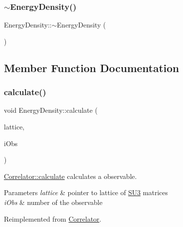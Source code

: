 \subsubsection{\texorpdfstring{$\sim$EnergyDensity()}{~EnergyDensity()}}
{\footnotesize\ttfamily Energy\+Density\+::$\sim$\+Energy\+Density (\begin{DoxyParamCaption}{ }\end{DoxyParamCaption})}



\subsection{Member Function Documentation}
\mbox{\label{class_energy_density_ae8e5e29257104d881bcabeadc3b2c9e7}} 
\subsubsection{\texorpdfstring{calculate()}{calculate()}}
{\footnotesize\ttfamily void Energy\+Density\+::calculate (\begin{DoxyParamCaption}\item[{\mbox{\hyperlink{class_lattice}{Lattice}}$<$ \mbox{\hyperlink{class_s_u3}{S\+U3}} $>$ $\ast$}]{lattice,  }\item[{unsigned int}]{i\+Obs }\end{DoxyParamCaption})\hspace{0.3cm}{\ttfamily [virtual]}}



\mbox{\hyperlink{class_correlator_ab33502ff305f891c5c2e6d66a26a0247}{Correlator\+::calculate}} calculates a observable. 


\begin{DoxyParams}{Parameters}
{\em lattice} & pointer to lattice of \mbox{\hyperlink{class_s_u3}{S\+U3}} matrices \\
\hline
{\em i\+Obs} & number of the observable \\
\hline
\end{DoxyParams}


Reimplemented from \mbox{\hyperlink{class_correlator_ab33502ff305f891c5c2e6d66a26a0247}{Correlator}}.

